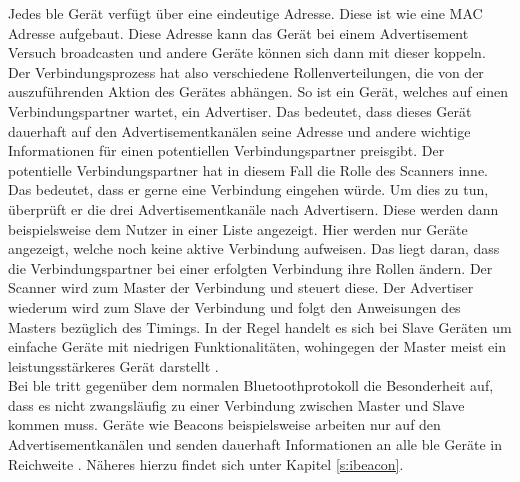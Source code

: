 \noindent Jedes \ac{ble} Gerät verfügt über eine eindeutige Adresse. Diese ist wie eine MAC Adresse aufgebaut. Diese Adresse kann das Gerät bei einem Advertisement Versuch broadcasten und andere Geräte können sich dann mit dieser koppeln. Der Verbindungsprozess hat also verschiedene Rollenverteilungen, die von der auszuführenden Aktion des Gerätes abhängen. So ist ein Gerät, welches auf einen Verbindungspartner wartet, ein Advertiser. Das bedeutet, dass dieses Gerät dauerhaft auf den Advertisementkanälen seine Adresse und andere wichtige Informationen für einen potentiellen Verbindungspartner preisgibt. Der potentielle Verbindungspartner hat in diesem Fall die Rolle des Scanners inne. Das bedeutet, dass er gerne eine Verbindung eingehen würde. Um dies zu tun, überprüft er die drei Advertisementkanäle nach Advertisern. Diese werden dann beispielsweise dem Nutzer in einer Liste angezeigt. Hier werden nur Geräte angezeigt, welche noch keine aktive Verbindung aufweisen. Das liegt daran, dass die Verbindungspartner bei einer erfolgten Verbindung ihre Rollen ändern. Der Scanner wird zum Master der Verbindung und steuert diese. Der Advertiser wiederum wird zum Slave der Verbindung und folgt den Anweisungen des Masters bezüglich des Timings. In der Regel handelt es sich bei Slave Geräten um einfache Geräte mit niedrigen Funktionalitäten, wohingegen der Master meist ein leistungsstärkeres Gerät darstellt \cite[Seite 18f]{Townsend14:GSB}.\\  

\noindent Bei \ac{ble} tritt gegenüber dem normalen Bluetoothprotokoll die Besonderheit auf, dass es nicht zwangsläufig zu einer Verbindung zwischen Master und Slave kommen muss. Geräte wie Beacons beispielsweise arbeiten nur auf den Advertisementkanälen und senden dauerhaft Informationen an alle \ac{ble} Geräte in Reichweite \cite[Seite 13]{Gast14:BPA}. Näheres hierzu findet sich unter Kapitel \ref{s:ibeacon}.\\


